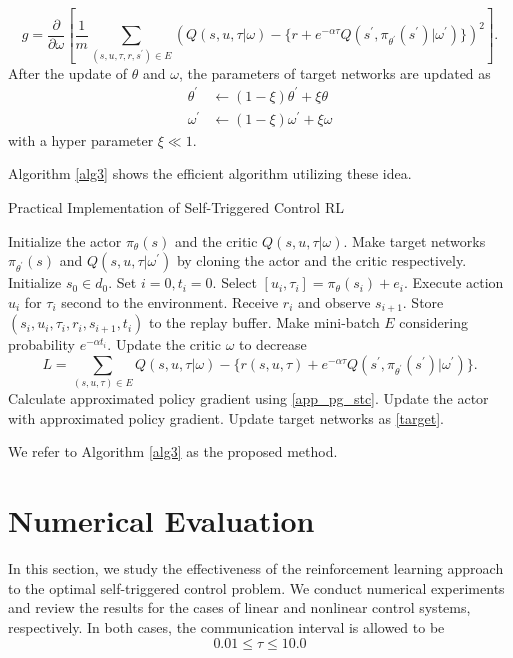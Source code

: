 \documentclass[english, dvipdfmx]{ampmt}             %
\newcommand{\pdif}[2]{\frac{\partial#1}{\partial#2}}
\begin{document}
\begin{equation}
	g = \pdif{}{\omega}\left[\frac{1}{m}\sum_{(s,u,\tau,r,s^{\prime})\in E}\left(Q(s,u,\tau|\omega) - \{r + e^{-\alpha\tau}Q(s^{\prime}, \pi_{\theta^{\prime}}(s^{\prime})|\omega^{\prime})\}\right)^2\right].
\end{equation}
After the update of $\theta$ and $\omega$, the parameters of target networks are updated as
\begin{equation}
  \begin{split}
  	\theta^{\prime} &\gets (1-\xi)\theta^{\prime} + \xi\theta \\
	\omega^{\prime} &\gets (1-\xi)\omega^{\prime} + \xi\omega \label{target}
  \end{split}
\end{equation}
with a hyper parameter $\xi\ll1$.\par
Algorithm \ref{alg3} shows the efficient algorithm utilizing these idea.
\begin{algorithm}                      
\caption{Practical Implementation of Self-Triggered Control RL}         
\label{alg3}                          
\begin{algorithmic}                  
    \STATE Initialize the actor $\pi_{\theta}(s)$ and the critic $Q(s,u,\tau|\omega)$.
    \STATE Make target networks $\pi_{\theta^{\prime}}(s)$ and $Q(s,u,\tau|\omega^{\prime})$ by cloning the actor and the critic respectively.
    	\STATE Initialize $s_0\in d_0$.
    	\STATE Set $i = 0, t_i = 0$.
    		\STATE Select $[u_i, \tau_i] = \pi_{\theta}(s_i) + e_i$.
		\STATE Execute action $u_i$ for $\tau_i$ second to the environment.
		\STATE Receive $r_i$ and observe $s_{i+1}$.
		\STATE Store $(s_i, u_i, \tau_i, r_i, s_{i+1}, t_i)$ to the replay buffer.
		\STATE Make mini-batch $E$ considering probability $e^{-\alpha t_i}$.
		\STATE Update the critic $\omega$ to decrease 
			\[L = \sum_{(s,u,\tau)\in E}Q(s,u,\tau|\omega) - \{r(s,u,\tau) + e^{-\alpha\tau}Q(s^{\prime}, \pi_{\theta^{\prime}}(s^{\prime})|\omega^{\prime})\}.\]
		\STATE Calculate approximated policy gradient using \eqref{app_pg_stc}.
		\STATE Update the actor with approximated policy gradient.
		\STATE Update target networks as \eqref{target}.
    	\ENDWHILE
    \ENDFOR
\end{algorithmic}
\end{algorithm}
We refer to Algorithm \ref{alg3} as the proposed method.

\section{Numerical Evaluation}
In this section, we study the effectiveness of the reinforcement learning approach to the optimal self-triggered control problem. We conduct numerical experiments and review the results for the cases of linear and nonlinear control systems, respectively. In both cases, the communication interval is allowed to be 
\begin{equation}
	0.01 \leq \tau \leq 10.0
\end{equation}
\end{document}
